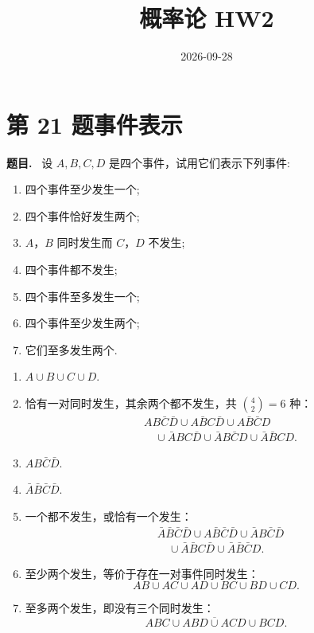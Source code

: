 \documentclass{article}
\title{概率论 HW2}
\author{\name \uid}
\date{2026-09-28}
\newenvironment{problem}{\par\medskip\noindent\textbf{题目.}\ }{\par\smallskip}
\begin{document}
\maketitle

\section*{第 21 题\quad 事件表示}

\begin{problem}
  设 $A,B,C,D$ 是四个事件，试用它们表示下列事件:
  \begin{enumerate}[(1)]
    \item 四个事件至少发生一个;
    \item 四个事件恰好发生两个;
    \item $A$，$B$ 同时发生而 $C$，$D$ 不发生;
    \item 四个事件都不发生;
    \item 四个事件至多发生一个;
    \item 四个事件至少发生两个;
    \item 它们至多发生两个.
  \end{enumerate}
\end{problem}

\begin{solution}
  \begin{enumerate}[(1)]
    \item $A\cup B\cup C\cup D$.

    \item 恰有一对同时发生，其余两个都不发生，共 $\binom42=6$ 种：
      \[
        \begin{aligned}
          &AB\bar C\bar D\cup A\bar BC\bar D\cup A\bar B\bar CD\\
          &\quad\cup\bar ABC\bar D\cup\bar AB\bar CD\cup\bar A\bar BCD .
        \end{aligned}
      \]

    \item $AB\bar C\bar D$.

    \item $\bar A\bar B\bar C\bar D$.

    \item 一个都不发生，或恰有一个发生：
      \[
        \begin{aligned}
          &\bar A\bar B\bar C\bar D\cup A\bar B\bar C\bar D\cup\bar AB\bar C\bar D\\
          &\quad\cup\bar A\bar BC\bar D\cup\bar A\bar B\bar CD .
        \end{aligned}
      \]

    \item 至少两个发生，等价于存在一对事件同时发生：
      \[
        AB\cup AC\cup AD\cup BC\cup BD\cup CD .
      \]

    \item 至多两个发生，即没有三个同时发生：
      \[
        \overline{ABC\cup ABD\cup ACD\cup BCD} .
      \]
  \end{enumerate}
\end{solution}
\end{document}
